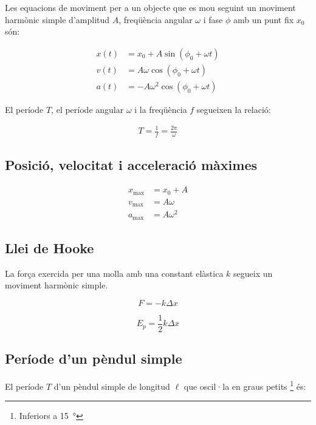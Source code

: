 Les equacions de moviment per a un objecte que es mou seguint un moviment harmònic simple d'amplitud $A$, freqüència angular $\omega$ i fase $\phi$ amb un punt fix $x_0$són:

\begin{align}
    x(t) &= x_0 + A\sin(\phi_0+\omega t) \\
    v(t) &= A\omega\cos(\phi_0+\omega t) \\
    a(t) &= -A\omega^2\cos(\phi_0+\omega t)
\end{align}

El període $T$, el període angular $\omega$ i la freqüència $f$ segueixen la
relació:

\begin{align}
    T = \frac{1}{f} = \frac{2\pi}{\omega}
\end{align}

\subsection{Posició, velocitat i acceleració màximes}
\label{sub:posicio_velocitat_i_acceleracio_maximes}


\begin{align}
    x_\mathrm{max} &= x_0 + A \\
    v_\mathrm{max} &= A\omega \\
    a_\mathrm{max} &= A\omega^2
\end{align}

\subsection{Llei de Hooke}
\label{sub:llei_de_hooke}

La força exercida per una molla amb una constant elàstica $k$ segueix un
moviment harmònic simple.

\begin{equation}
    F = -k\Delta x
\end{equation}

\begin{equation}
    E_p = \frac{1}{2}k\Delta x
\end{equation}

\subsection{Període d'un pèndul simple}
\label{sub:periode_d_un_pendul_simple}

El període $T$ d'un pèndul simple de longitud $\ell$ que oscil·la en graus petits \footnote{Inferiors a \SI{15}{\degree}} és:

